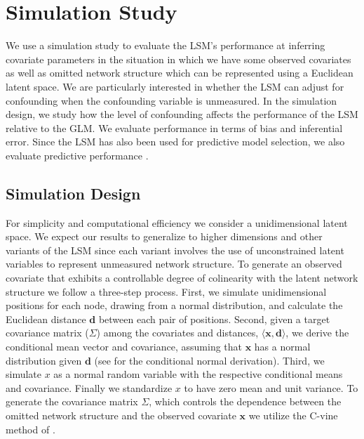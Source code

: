 \documentclass[11pt]{article}
\begin{document}
\section{Simulation Study}

We use a simulation study to evaluate the LSM's performance at
inferring covariate parameters in the situation in which we have some
observed covariates as well as omitted network structure which can be
represented using a Euclidean latent space. We are particularly
interested in whether the LSM can adjust for confounding when the
confounding variable is unmeasured. In the simulation design, we study
how the level of confounding affects the performance of the LSM
relative to the GLM. We evaluate performance in terms of bias and
inferential error. Since the LSM has also been used for predictive
model selection, we also evaluate predictive performance
\citep{ward2013gravity, fletcher2011social, fletcher2013network,
  chiu2011unifying}.

\subsection{Simulation Design}

For simplicity and computational efficiency we consider a
unidimensional latent space. We expect our results to generalize to
higher dimensions and other variants of the LSM since each variant
involves the use of unconstrained latent variables to represent
unmeasured network structure. To generate an observed covariate that
exhibits a controllable degree of colinearity with the latent network
structure we follow a three-step process. First, we simulate
unidimensional positions for each node, drawing from a normal
distribution, and calculate the Euclidean distance $\mathbf{d}$
between each pair of positions. Second, given a target covariance
matrix ($\Sigma$) among the covariates and distances, $\langle
\mathbf{x}, \mathbf{d} \rangle$, we derive the conditional mean vector
and covariance, assuming that $\mathbf{x}$ has a normal distribution
given $\mathbf{d}$ (see \cite[pp. 116--117]{eaton1983} for the
conditional normal derivation). Third, we simulate $x$ as a normal
random variable with the respective conditional means and
covariance. Finally we standardize $x$ to have zero mean and unit
variance. To generate the covariance matrix $\Sigma$, which controls
the dependence between the omitted network structure and the observed
covariate $\mathbf{x}$ we utilize the C-vine method of
\cite{lewandowski2009generating}.
\end{document}
